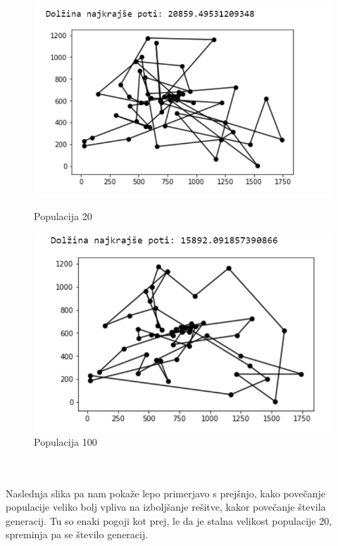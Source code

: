 \documentclass[12pt,a4paper]{amsart}
\theoremstyle{definition} %
\theoremstyle{plain} %
\begin{document}
\begin{figure}[h!]
\begin{minipage}[t]{0.48\textwidth}
\includegraphics[width=\linewidth,keepaspectratio=true]{primer-pop1}
\caption{Populacija 20}
\label{pop1}
\end{minipage}
\hspace*{\fill} %
\begin{minipage}[t]{0.48\textwidth}
\includegraphics[width=\linewidth,keepaspectratio=true]{primer-pop2}
\caption{Populacija 100}
\label{pop2}
\end{minipage}
\end{figure}
\\
\\
Naslednja slika pa nam pokaže lepo primerjavo s prejšnjo, kako povečanje populacije veliko bolj vpliva na izboljšanje rešitve, kakor povečanje števila generacij. Tu so enaki pogoji kot prej, le da je stalna velikost populacije 20, spreminja pa se število generacij. 
\end{document}

